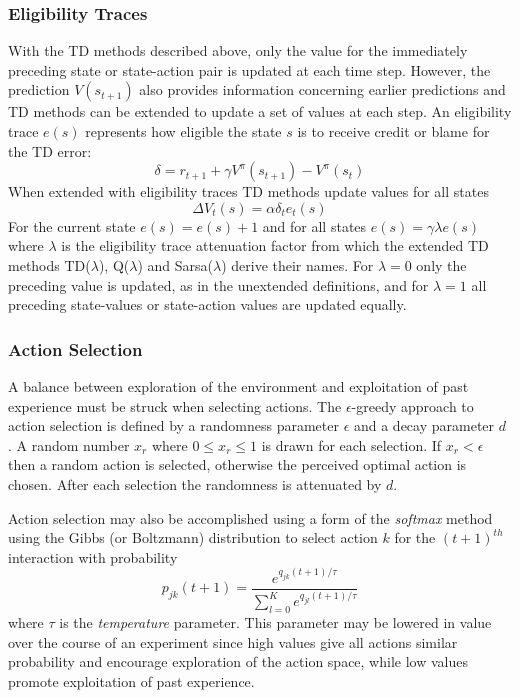 \subsubsection{Eligibility Traces}
\label{sec:eligibility}
With the TD methods described above, only the value for the immediately
preceding state or state-action pair is updated at each time step.  However, the
prediction $V(s_{t+1})$ also provides information concerning earlier predictions
and TD methods can be extended to update a set of values at each step.  An
eligibility trace $e(s)$ \cite{tanner:2005} represents how eligible the state
$s$ is to receive credit or blame for the TD error:
\begin{equation}
\delta = r_{t+1} + \gamma V^\pi(s_{t+1}) - V^\pi(s_t)
\end{equation}
When extended with eligibility traces TD methods update values for all states
\begin{equation}
\Delta V_t(s) = \alpha \delta_t e_t(s)
\end{equation}
For the current state $e(s) = e(s) + 1$ and for all states
$e(s) = \gamma \lambda e(s)$ where $\lambda$ is the eligibility trace
attenuation factor from which the extended TD methods TD($\lambda$),
Q($\lambda$) and Sarsa($\lambda$) derive their names. For $\lambda = 0$ only
the preceding value is updated, as in the unextended definitions,
and for $\lambda = 1$ all preceding state-values or state-action values are
updated equally.

\subsubsection{Action Selection}
A balance between exploration of the environment and exploitation of past
experience must be struck when selecting actions.  The $\epsilon$-greedy
approach to action selection is defined by a randomness parameter $\epsilon$ and
a decay parameter $d$ \cite{rivest:1990}.  A random number $x_r$ where $0 \leq
x_r \leq 1$ is drawn for each selection.  If $x_r < \epsilon$ then a random
action is selected, otherwise the perceived optimal action is chosen. After each
selection the randomness is attenuated by $d$.

Action selection may also be accomplished using a form of the \textit{softmax}
method \cite[\S2]{suttonbarto:1998} using the Gibbs (or
Boltzmann) distribution to select action $k$ for the $(t+1)^{th}$ interaction with probability
\begin{equation}
p_{jk}(t+1) = \frac{e^{q_{jk}(t+1)/\tau}}{\sum_{l=0}^K e^{q_{jl}(t+1)/\tau}}
\end{equation}
where $\tau$ is the \textit{temperature} parameter.  This parameter may be
lowered in value over the course of an experiment since high values give all
actions similar probability and encourage exploration of the action space,
while low values promote exploitation of past experience.

